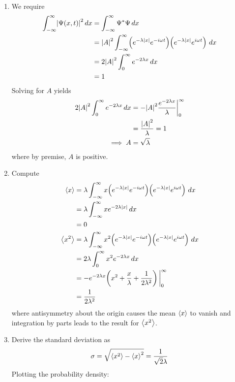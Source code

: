 \documentclass[a4paper]{article}
\begin{document}
\begin{enumerate}[label=(\alph*)]
	\item We require
	\begin{align*}
		\int^{\infty}_{-\infty} \abs{\Psi \!\left( x,t \right)}^{2} \, dx & = \int^{\infty}_{-\infty} \Psi^{*}\Psi \, dx \\
							 & = \abs{A}^{2}\int^{\infty}_{-\infty} \!\left( e^{-\lambda \abs{x}}e^{-i \omega t} \right) \!\left( e^{-\lambda \abs{x}}e^{i \omega t} \right)\, dx \\
							 & = 2 \abs{A}^{2}\int^{\infty}_{0} e^{-2 \lambda x} \, dx \\
						         & = 1
	\end{align*}
	Solving for \( A \) yields
	\begin{align*}
		2 \abs{A}^{2}\int^{\infty}_{0} e^{-2 \lambda x} \, dx & = -\abs{A}^{2}\frac{e^{-2 \lambda x}}{\lambda}\bigg|^{\infty}_{0} \\
							      & = \frac{\abs{A}^{2}}{\lambda} = 1 \\
		\implies A & = \sqrt{\lambda}
	\end{align*}
	where by premise, \( A \) is positive.
	\item Compute
	\begin{align*}
		\braket{x} & = \lambda\int^{\infty}_{-\infty} x \!\left( e^{-\lambda \abs{x}}e^{-i \omega t} \right)\!\left( e^{-\lambda \abs{x}}e^{i \omega t} \right) \, dx \\
		 & = \lambda\int^{\infty}_{-\infty} xe^{-2 \lambda \abs{x}} \, dx \\ 
		 & = 0 \\
		\braket{x^{2}} & = \lambda\int^{\infty}_{-\infty} x^{2} \!\left( e^{-\lambda \abs{x}}e^{-i \omega t} \right)\!\left( e^{-\lambda \abs{x}}e^{i \omega t} \right) \, dx \\
			       & = 2 \lambda \int^{\infty}_{0} x^{2}e^{-2 \lambda x} \, dx \\
			       & = -e^{-2 \lambda x}\!\left( x^{2} + \frac{x}{\lambda} + \frac{1}{2 \lambda^{2}} \right)\bigg|^{\infty}_{0} \\
			       & = \frac{1}{2 \lambda^{2}}
	\end{align*}
	where antisymmetry about the origin causes the mean \( \braket{x} \) to vanish and integration by parts leads to the result for \( \braket{x^{2}} \).
	\item Derive the standard deviation as 
	\[
		\sigma = \sqrt{\braket{x^{2}} - \braket{x}^{2}} = \frac{1}{\sqrt{2} \lambda} 
	\]
	Plotting the probability density: 

\end{enumerate}
\end{document}
